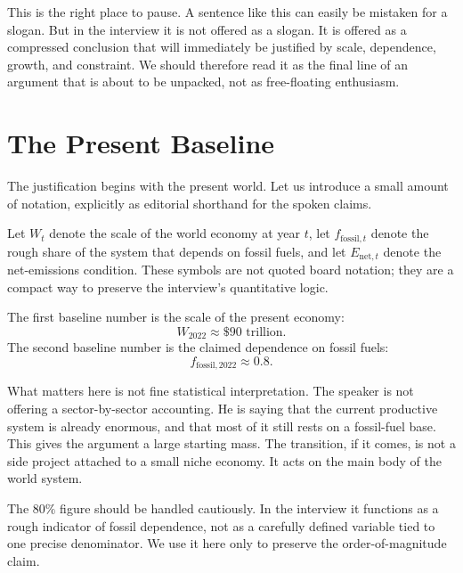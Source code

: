 This is the right place to pause. A sentence like this can easily be mistaken for a slogan. But in the interview it is not offered as a slogan. It is offered as a compressed conclusion that will immediately be justified by scale, dependence, growth, and constraint. We should therefore read it as the final line of an argument that is about to be unpacked, not as free-floating enthusiasm.

\section{The Present Baseline}

The justification begins with the present world. Let us introduce a small amount of notation, explicitly as editorial shorthand for the spoken claims.

\begin{definition}
Let \(W_t\) denote the scale of the world economy at year \(t\), let \(f_{\mathrm{fossil},t}\) denote the rough share of the system that depends on fossil fuels, and let \(E_{\mathrm{net},t}\) denote the net-emissions condition. These symbols are not quoted board notation; they are a compact way to preserve the interview's quantitative logic.
\end{definition}

The first baseline number is the scale of the present economy:
\begin{equation}
W_{2022} \approx \$90\text{ trillion}.
\end{equation}
The second baseline number is the claimed dependence on fossil fuels:
\begin{equation}
f_{\mathrm{fossil},2022} \approx 0.8.
\end{equation}

What matters here is not fine statistical interpretation. The speaker is not offering a sector-by-sector accounting. He is saying that the current productive system is already enormous, and that most of it still rests on a fossil-fuel base. This gives the argument a large starting mass. The transition, if it comes, is not a side project attached to a small niche economy. It acts on the main body of the world system.

\begin{remark}
The \(80\%\) figure should be handled cautiously. In the interview it functions as a rough indicator of fossil dependence, not as a carefully defined variable tied to one precise denominator. We use it here only to preserve the order-of-magnitude claim.
\end{remark}


